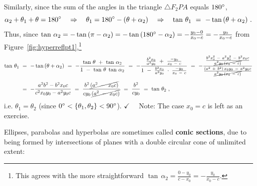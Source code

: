 Similarly, since the sum of the angles in the triangle
$\triangle F_2PA$ equals $180^\circ$,
\[
\alpha_2 + \theta_1 + \theta = 180^\circ \quad\Rightarrow\quad
\theta_1 = 180^\circ - (\theta + \alpha_2) \quad\Rightarrow\quad
\tan\,\theta_1 ~=~ -\tan\,(\theta + \alpha_2) ~.
\]
\newpage
\noindent Thus, since $\tan\,\alpha_2 = -\tan\,(\pi - \alpha_2) =
-\tan\,(180^\circ - \alpha_2) = -\frac{y_0-0}{x_0-c} =
-\frac{y_0}{x_0-c}$ from Figure~\ref{fig:hyperreflpt1},\footnote{ This
agrees with the more straightforward $\tan\,\alpha_2 =
\frac{0-y_0}{c-x_0} = -\frac{y_0}{x_0-c}$.  }
\begin{align*}
\tan\,\theta_1 ~&=~ -\tan\,(\theta + \alpha_2) ~=~ -\frac{\tan\,\theta ~+~ \tan\,\alpha_2}{1 ~-~ \tan\,\theta\;\tan\,\alpha_2} ~=~
 -\frac{\frac{b^2x_0}{a^2y_0} ~+~ \frac{-y_0}{x_0 ~-~ c}}{1 ~-~
 \frac{b^2x_0}{a^2y_0}\;\cdot\;\frac{-y_0}{x_0 ~-~ c}} ~=~
 -\frac{\frac{b^2 x_0^2 ~-~ a^2 y_0^2 ~-~ b^2 x_0 c}{\cancel{a^2 y_0\,(x_0 ~-~
  c)}}}{\frac{(a^2 ~+~ b^2)\,x_0 y_0 ~-~ a^2 y_0 c}{\cancel{a^2 y_0\,(x_0 ~-~ c)}}}\\[6pt]
&=~ -\frac{a^2 b^2 - b^2 x_0 c}{c^2 x_0 y_0 - a^2 y_0 c} ~=~
  \frac{b^2 \,\cancel{(a^2 ~-~ x_0 c)}}{cy_0\,\cancel{(a^2 ~-~ x_0 c)}} ~=~ \frac{b^2}{cy_0}
~=~ \tan\,\theta_2 ~,
\end{align*}
i.e. $\theta_1 = \theta_2$
(since $0^\circ < \{\theta_1,\theta_2\} < 90^\circ$). $\checkmark\quad$
Note: The case $x_0=c$ is left as an exercise.\vspace{1mm}

\divider
\vspace{2mm}

Ellipses, parabolas and hyperbolas are sometimes called
\textbf{conic sections}, due to being formed by
intersections of planes with a double circular cone of unlimited extent:

